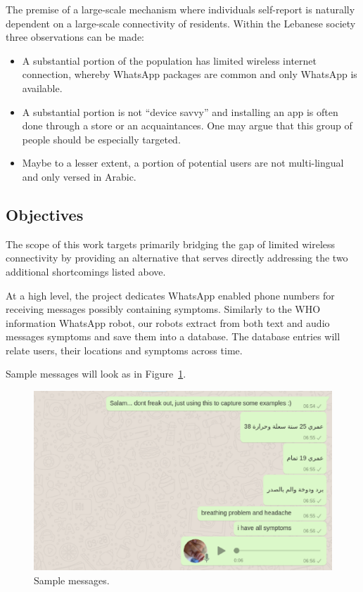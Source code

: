 \documentclass[12pt, a4paper]{article}
\begin{document}
The premise of a large-scale mechanism where individuals self-report
is naturally dependent on a large-scale connectivity of
residents. Within the Lebanese society three observations can be made:
\begin{itemize}
\item A substantial portion of the population has limited wireless
  internet connection, whereby WhatsApp packages are common and only
  WhatsApp is available.
\item A substantial portion is not ``device savvy'' and installing an
  app is often done through a store or an acquaintances. One may argue
  that this group of people should be especially targeted.
\item Maybe to a lesser extent, a portion of potential users are not
  multi-lingual and only versed in Arabic.
\end{itemize}


\subsection*{Objectives}

The scope of this work targets primarily bridging the gap of limited
wireless connectivity by providing an alternative that serves directly
addressing the two additional shortcomings listed above.

At a high level, the project dedicates WhatsApp enabled phone numbers
for receiving messages possibly containing symptoms. Similarly to the
WHO information WhatsApp robot, our robots extract from both text and
audio messages symptoms and save them into a database. The database
entries will relate users, their locations and symptoms across time.

Sample messages will look as in Figure~\ref{fig:sample}.

\begin{figure}[!htb]
  \begin{center}
    \includegraphics[width = 13cm]{examples.eps}
    \caption{Sample messages.\label{fig:sample}}
  \end{center}
\end{figure}
\end{document}
